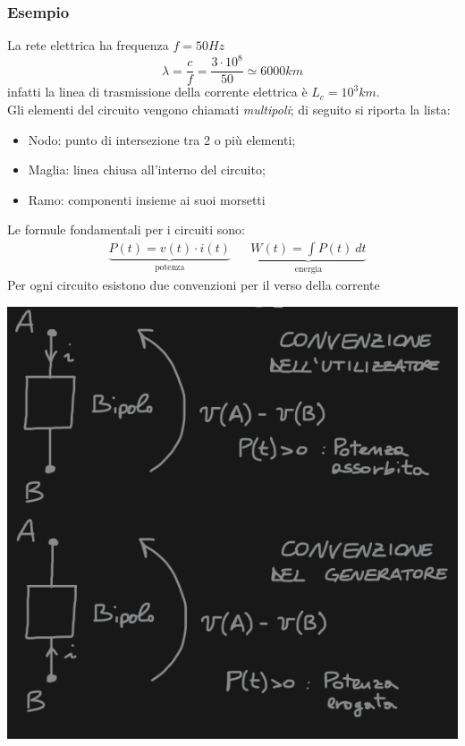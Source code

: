 \documentclass{article}
\begin{document}
\subsubsection*{Esempio}
La rete elettrica ha frequenza $f = 50 Hz$
\[
    \lambda = \dfrac{c}{f} = \dfrac{3 \cdot 10^{8}}{50} \simeq 6000 km
\]
infatti la linea di trasmissione della corrente elettrica è $L_c = 10^3 km$.
\vspace*{0.2cm}\\
Gli elementi del circuito vengono chiamati \textit{multipoli}; di seguito si riporta la lista:
\begin{itemize}
    \item Nodo: punto di intersezione tra 2 o più elementi;
    \item Maglia: linea chiusa all'interno del circuito;
    \item Ramo: componenti insieme ai suoi morsetti
\end{itemize}
Le formule fondamentali per i circuiti sono:
\begin{align*}
    &\underbrace{P(t) = v(t) \cdot i(t)}_{\text{potenza}} & &\underbrace{W(t) = \int P(t) \ dt}_{\text{energia}}
\end{align*}
Per ogni circuito esistono due convenzioni per il verso della corrente
\begin{center}
    \includegraphics[scale=0.3]{Image/Convenzione.png}
\end{center}
\end{document}
